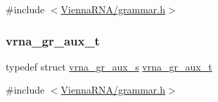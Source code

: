 {\ttfamily \#include $<$\mbox{\hyperlink{grammar_8h}{Vienna\+R\+N\+A/grammar.\+h}}$>$}

\mbox{\label{group__grammar_ga8825fbe6d7de2ff61c232cc7550a82cc}} 
\subsubsection{\texorpdfstring{vrna\+\_\+gr\+\_\+aux\+\_\+t}{vrna\_gr\_aux\_t}}
{\footnotesize\ttfamily typedef struct \mbox{\hyperlink{group__grammar_structvrna__gr__aux__s}{vrna\+\_\+gr\+\_\+aux\+\_\+s}} \mbox{\hyperlink{group__grammar_ga8825fbe6d7de2ff61c232cc7550a82cc}{vrna\+\_\+gr\+\_\+aux\+\_\+t}}}



{\ttfamily \#include $<$\mbox{\hyperlink{grammar_8h}{Vienna\+R\+N\+A/grammar.\+h}}$>$}

